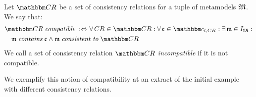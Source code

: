 \begin{definition}[Compatibility] \label{def:compatibility}
    Let $\consistencyrelationset{CR}$ be a set of consistency relations for a tuple of metamodels $\metamodeltuple{M}$.
    We say that:
    \begin{align*}
        &
        \consistencyrelationset{CR} \compatiblemath \equivalentperdefinition
        \forall \consistencyrelation{CR}{} \in \consistencyrelationset{CR} : \forall \conditionelement{c}{} \in \condition{c}{l, \consistencyrelation{CR}{}}: \exists \modeltuple{m} \in \metamodeltupleinstanceset{M} : \\
        & \formulaskip
        \modeltuple{m} \containsmath \conditionelement{c}{} \land \modeltuple{m} \consistenttomath \consistencyrelationset{CR}
    \end{align*}
    We call a set of consistency relation $\consistencyrelationset{CR}$ \emph{incompatible} if it is not compatible.
\end{definition}

We exemplify this notion of compatibility at an extract of the initial example with different consistency relations.


